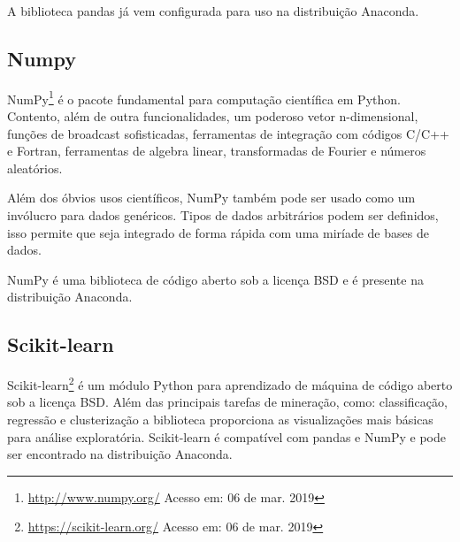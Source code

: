 A biblioteca pandas já vem configurada para uso na distribuição Anaconda.

\subsection{Numpy}

NumPy\footnote{\url{http://www.numpy.org/} Acesso em: 06 de mar. 2019} é o
pacote fundamental para computação científica em Python. Contento, além de outra
funcionalidades, um poderoso vetor n-dimensional, funções de broadcast
sofisticadas, ferramentas de integração com códigos C/C++ e Fortran, ferramentas
de algebra linear, transformadas de Fourier e números aleatórios.

Além dos óbvios usos científicos, NumPy também pode ser usado como um invólucro
para dados genéricos. Tipos de dados arbitrários podem ser definidos, isso
permite que  seja integrado de forma rápida com uma miríade de bases de dados.

NumPy é uma biblioteca de código aberto sob a licença BSD e é presente na
distribuição Anaconda.

\subsection{Scikit-learn}

Scikit-learn\footnote{\url{https://scikit-learn.org/} Acesso em: 06 de mar.
2019} é um módulo Python para aprendizado de máquina de código aberto sob a
licença BSD. Além das principais tarefas de mineração, como: classificação,
regressão e clusterização a biblioteca proporciona as visualizações mais básicas
para análise exploratória. Scikit-learn é compatível com pandas e NumPy e pode
ser encontrado na distribuição Anaconda.
